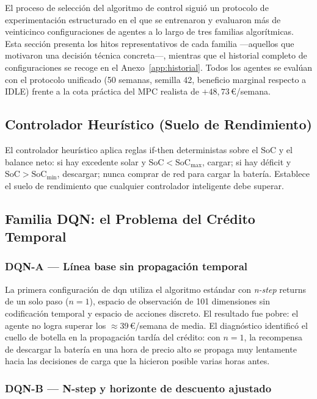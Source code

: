 \documentclass[12pt, a4paper, twoside]{report}
\begin{document}
El proceso de selección del algoritmo de control siguió un protocolo de
experimentación estructurado en el que se entrenaron y evaluaron más de
veinticinco configuraciones de agentes a lo largo de tres familias
algorítmicas. Esta sección presenta los hitos representativos de cada familia
—aquellos que motivaron una decisión técnica concreta—, mientras que el
historial completo de configuraciones se recoge en el
Anexo~\ref{app:historial}. Todos los agentes se evalúan con el protocolo
unificado (50 semanas, semilla 42, beneficio marginal respecto a IDLE) frente
a la cota práctica del MPC realista de $+48{,}73$\,€/semana.

\subsection{Controlador Heurístico (Suelo de Rendimiento)}

El controlador heurístico aplica reglas if-then deterministas sobre el SoC y
el balance neto: si hay excedente solar y $\text{SoC} < \text{SoC}_{\max}$,
cargar; si hay déficit y $\text{SoC} > \text{SoC}_{\min}$, descargar; nunca
comprar de red para cargar la batería. Establece el suelo de rendimiento que
cualquier controlador inteligente debe superar.

\subsection{Familia DQN: el Problema del Crédito Temporal}

\subsubsection{DQN-A — Línea base sin propagación temporal}

La primera configuración de \acrshort{dqn} utiliza el algoritmo estándar con
\textit{n-step} returns de un solo paso ($n=1$), espacio de observación de
101 dimensiones sin codificación temporal y espacio de acciones discreto. El
resultado fue pobre: el agente no logra superar los $\approx$39\,€/semana de
media. El diagnóstico identificó el cuello de botella en la propagación tardía
del crédito: con $n=1$, la recompensa de descargar la batería en una hora de
precio alto se propaga muy lentamente hacia las decisiones de carga que la
hicieron posible varias horas antes.

\subsubsection{DQN-B — N-step y horizonte de descuento ajustado}
\end{document}
